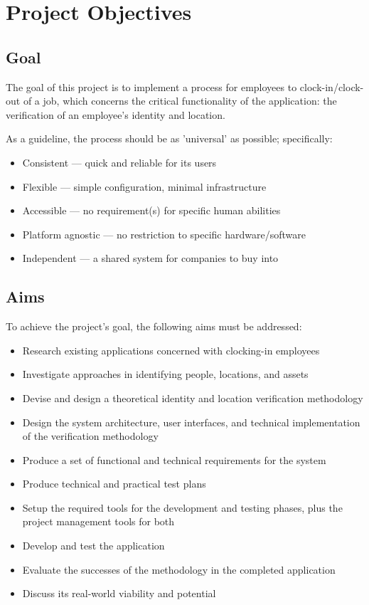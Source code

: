 \section{Project Objectives}

\subsection{Goal} \label{ss:goal}
The goal of this project is to implement a process for
employees to \gls{clock-in}/\gls{clock-out} of a job, which
concerns the critical functionality of the application: the
verification of an employee's identity and location.

As a guideline, the process should be as 'universal' as
possible; specifically:

\begin{itemize}
  \item Consistent --- quick and reliable for its users
  \item Flexible --- simple configuration, minimal
        infrastructure
  \item Accessible --- no requirement(s) for specific
        human abilities
  \item Platform agnostic --- no restriction to specific
        hardware/software
  \item Independent --- a shared system for companies to
        buy into
\end{itemize}

\subsection{Aims}
To achieve the project's goal, the following aims must be
addressed:

\begin{itemize}
  \item Research existing applications concerned with
        clocking-in employees
  \item Investigate approaches in identifying people,
        locations, and assets
  \item Devise and design a theoretical identity and
        location verification methodology
  \item Design the system architecture, user interfaces,
        and technical implementation of the
        verification methodology
  \item Produce a set of functional and technical
        requirements for the system
  \item Produce technical and practical test plans
  \item Setup the required tools for the development and
        testing phases, plus the project management tools
        for both
  \item Develop and test the application
  \item Evaluate the successes of the methodology in the
        completed application
  \item Discuss its real-world viability and potential
\end{itemize}